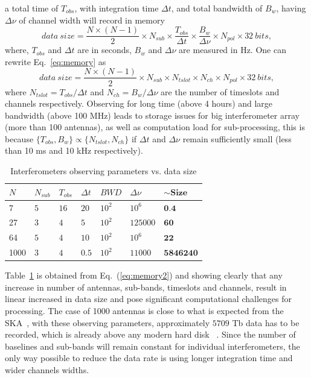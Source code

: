 \documentclass[useAMS,usenatbib]{mn2e}
\begin{document}
a total time of $T_{obs}$, with integration time  $\Delta t$, and total bandwidth of $B_{w}$, having $\Delta \nu$ of 
channel width will record in memory
\begin{equation}
data~size = \frac{N\times(N-1)}{2}\times N_{sub}  \times \frac{T_{obs}}{\Delta t} \times \frac{B_{w}}{\Delta \nu}\times N_{pol}\times 32 ~bits,\label{eq:memory}
\end{equation} 
where, $T_{obs}$ and $\Delta t$ are in seconds, $B_{w}$ and $\Delta \nu$ are measured in Hz. 
One can rewrite Eq.~\ref{eq:memory} as
\begin{equation}
data~size= \frac{N\times(N-1)}{2}\times N_{sub}  \times N_{tslot} \times N_{ch}\times N_{pol}\times 32 ~bits,\label{eq:memory2}
\end{equation} 
where $ N_{tslot}=T_{obs}/\Delta t $ and $N_{ch}=B_{w}/\Delta \nu$ are the number of timeslots and channels respectively.
Observing for long time (above 4 hours) and large bandwidth (above 100 MHz) leads to storage issues for big interferometer array (more than 100 antennas), as well as computation load for sub-processing, this is because $\{T_{obs}, B_{w}\} \propto \{N_{tslot}, N_{ch}\}$
if $\Delta t$ and $\Delta \nu$ remain sufficiently small (less than 10 ms and 10 kHz respectively).
\begin{table}
\hspace{0.7cm}\begin{tabular}{lllllll}
\hline
{\bf $N$} & {\bf $N_{sub}$  } & {\bf  $T_{obs}$} & {\bf  $\Delta t$} & {\bf  $BWD$} & {\bf  $\Delta \nu$}& {\bf  $\sim \textbf{Size}$}\\
\hline\hline
7 &$5$ &$16$&$20$&$ 10^2$&$10^6$&$\textbf{0.4}$\\
27&$3$ &$4$&$5$&$10^2$&$125000$&$\textbf{60}$\\
64 & $5$& $4$&$10$&$10^2$&$10^6$&$\textbf{22}$\\
1000 & $3$& $4$&$0.5$&$10^2$&$11000$&$\textbf{5846240}$\\
\hline
\end{tabular}
\caption{ Interferometers observing parameters vs. data size}
\label{tab:datasize}
\end{table}
Table~\ref{tab:datasize} is obtained from Eq.~(\ref{eq:memory2}) and showing clearly that any increase in number of antennas, sub-bands, timeslots and channels,
result in linear increased in data size and pose significant computational challenges for processing. The case of 1000 antennas 
is close to what is expected from the SKA~\citep{krichbaum1999ska,wright2002model,patel2006antenna}, with 
these observing parameters, approximately $ 5709$ Tb data has to be recorded, which is already above any modern hard disk ~\citep{cloudsim2015pervasive}.
Since the number 
of baselines and sub-bands will remain constant for individual interferometers, the only way possible to reduce the data rate 
is using longer integration time and wider channels widths.
\end{document}
